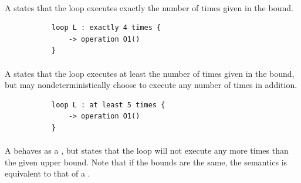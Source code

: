 \paragraph{\mdefiniteloopbound}
A \mdefiniteloopbound{} states that the loop executes exactly the
number of times given in the bound.

\begin{figure}[h!]
\begin{subfigure}[t]{\egtextwidth}
\begin{lstlisting}[style=Example]
loop L : exactly 4 times {
    -> operation O1()
}
\end{lstlisting}
\end{subfigure}
\hfill
\begin{subfigure}[t]{\eggraphicalwidth}
  \gsecaption
  \centering
\end{subfigure}
\end{figure}

\paragraph{\mlowerloopbound}
A \mlowerloopbound{} states that the loop executes at least the
number of times given in the bound, but may nondeterministically
choose to execute any number of times in addition.

\begin{figure}[h!]
\begin{subfigure}[t]{\egtextwidth}
\begin{lstlisting}[style=Example]
loop L : at least 5 times {
    -> operation O1()
}
\end{lstlisting}
\end{subfigure}
\hfill
\begin{subfigure}[t]{\eggraphicalwidth}
  \gsecaption
  \centering
\end{subfigure}
\end{figure}

\paragraph{\mrangeloopbound}
A \mrangeloopbound{} behaves as a \mlowerloopbound, but states that
the loop will not execute any more times than the given upper bound.
Note that if the bounds are the same, the semantics is equivalent
to that of a \mdefiniteloopbound{}.


